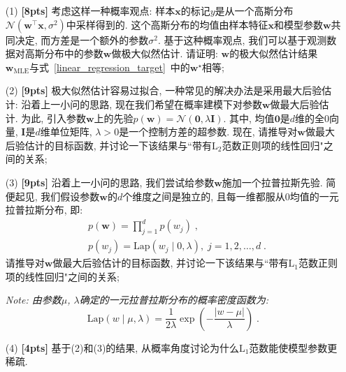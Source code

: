 \documentclass[a4paper,UTF8]{article}
\numberwithin{equation}{section}
\theoremstyle{definition}
\newcommand{\vct}[1]{\boldsymbol{#1}} %
\newcommand{\vw}{\vct{w}}
\newcommand{\vx}{\vct{x}}
\newcommand{\vzero}{\vct{0}}
\newcommand{\mat}[1]{\boldsymbol{#1}} %
\newcommand{\mI}{\mat{I}}
\begin{document}
\begin{enumerate}
    \item[(1)] \textbf{[8pts]} 考虑这样一种概率观点: 样本$\vx$的标记$y$是从一个高斯分布$\mathcal{N}(\vw^\top\vx,\sigma^2)$中采样得到的. 这个高斯分布的均值由样本特征$\vx$和模型参数$\vw$共同决定, 而方差是一个额外的参数$\sigma^2$. 基于这种概率观点, 我们可以基于观测数据对高斯分布中的参数$\vw$做极大似然估计. 请证明: $\vw$的极大似然估计结果$\vw_{\mathrm{MLE}}$与式~\eqref{linear_regression_target}~中的$\vw^\star$相等;
	
    \item[(2)] \textbf{[9pts]} 极大似然估计容易过拟合, 一种常见的解决办法是采用最大后验估计: 沿着上一小问的思路, 现在我们希望在概率建模下对参数$\vw$做最大后验估计. 为此, 引入参数$\vw$上的先验$p(\vw)=\mathcal{N}(\vzero,\lambda\mat{I})$. 其中, 均值$\vzero$是$d$维的全$0$向量, $\mI$是$d$维单位矩阵, $\lambda>0$是一个控制方差的超参数. 现在, 请推导对$\vw$做最大后验估计的目标函数, 并讨论一下该结果与``带有$\mathrm{L}_2$范数正则项的线性回归"之间的关系;
	
    \item[(3)] \textbf{[9pts]} 沿着上一小问的思路, 我们尝试给参数$\vw$施加一个拉普拉斯先验. 简便起见, 我们假设参数$\vw$的$d$个维度之间是独立的, 且每一维都服从$0$均值的一元拉普拉斯分布, 即:
    \begin{equation}
	\begin{aligned}
	& p(\vw)=\prod_{j=1}^{d}p(w_j)\;, \\
	& p(w_j)=\mathrm{Lap}(w_j\mid 0,\lambda),\;j=1,2,\ldots,d\;.
	\end{aligned}
    \end{equation}
    请推导对$\vw$做最大后验估计的目标函数, 并讨论一下该结果与``带有$\mathrm{L}_1$范数正则项的线性回归"之间的关系;

    \textit{Note: 由参数$\mu$, $\lambda$确定的一元拉普拉斯分布的概率密度函数为:}
    \begin{equation}
	\mathrm{Lap}(w\mid\mu,\lambda)=\frac{1}{2\lambda}\exp\left(-\frac{|w-\mu|}{\lambda}\right)\;.
    \end{equation}	
    \item[(4)] \textbf{[4pts]} 基于(2)和(3)的结果, 从概率角度讨论为什么$\mathrm{L}_{1}$范数能使模型参数更稀疏.
\end{enumerate}
\end{document}
